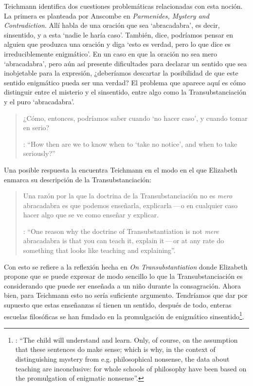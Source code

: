 Teichmann identifica dos cuestiones problemáticas relacionadas con esta noción. La primera es planteada por Anscombe en \emph{Parmenides, Mystery and Contradiction}. Allí habla de una oración que sea `abracadabra', es decir, sinsentido, y a esta \enquote*{nadie le haría caso}. También, dice, podríamos pensar en alguien que produzca una oración y diga \enquote*{esto es verdad, pero lo que dice es irreduciblemente enigmático}. En un caso en que la oración no sea mero `abracadabra', pero aún así presente dificultades para declarar un sentido que sea inobjetable para la expresión, ¿deberíamos descartar la posibilidad de que este sentido enigmático pueda ser una verdad? El problema que aparece aquí es cómo distinguir entre el misterio y el sinsentido, entre algo como la Transubstanciación y el puro `abracadabra'. \blockquote[{\Cite[213]{teichmann2008ans}}: \enquote{How then are we to know when to `take no notice', and when to take seriously?}]{¿Cómo, entonces, podríamos saber cuando `no hacer caso', y cuando tomar en serio?}

Una posible respuesta la encuentra Teichmann en el modo en el que Elizabeth enmarca su descripción de la Transubstanciación: \blockquote[{\Cite[213]{teichmann2008ans}}: \enquote{One reason why the doctrine of Transubstantiation is not \emph{mere} abracadabra is that you can teach it, explain it\,---\,or at any rate do something that looks like teaching and explaining}.]{Una razón por la que la doctrina de la Transubstanciación no es \emph{mero} abracadabra es que podemos enseñarla, explicarla\,---\,o en cualquier caso hacer algo que se ve como enseñar y explicar.} Con esto se refiere a la reflexión hecha en \emph{On Transubstantiation} donde Elizabeth propone que se puede expresar de modo sencillo lo que la Transubstanciación es considerando que puede ser enseñada a un niño durante la consagración. Ahora bien, para Teichmann esto no sería suficiente argumento. Tendríamos que dar por supuesto que estas enseñanzas sí tienen un sentido, después de todo, enteras escuelas filosóficas se han fundado en la promulgación de enigmático sinsentido\footnote{\cite[Cf.][213]{teichmann2008ans}: \enquote{The child will understand and learn. Only, of course, on the assumption that these sentences do make sense; which is why, in the context of distinguishing mystery from e.g. philosophical nonsense, the data about teaching are inconclusive: for whole schools of philosophy have been based on the promulgation of enigmatic nonsense}.}.

